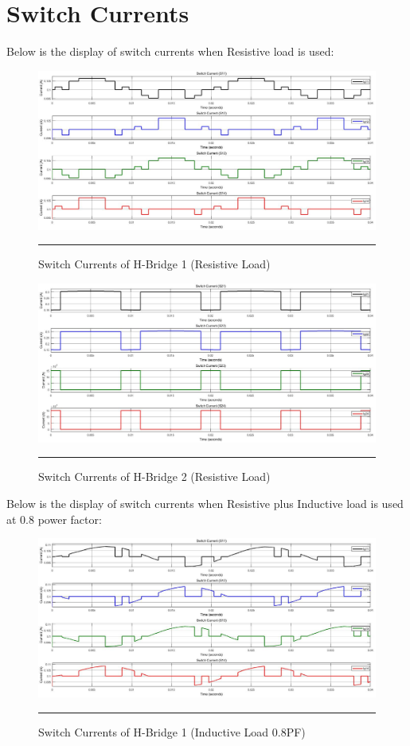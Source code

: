\section{Switch Currents}
Below is the display of switch currents when Resistive load is used:
\begin{figure}[htbp]
	\centering
	\includegraphics[width = 6in]{./Figures/Photos/Simulink/Switch_currents_1_Res.jpg}
	\rule{35em}{1pt}
	\caption{Switch Currents of H-Bridge 1 (Resistive Load)}
\end{figure}

\begin{figure}[htbp]
	\centering
	\includegraphics[width = 6in]{./Figures/Photos/Simulink/Switch_currents_2_Res.jpg}
	\rule{35em}{1pt}
	\caption{Switch Currents of H-Bridge 2 (Resistive Load)}
\end{figure}
\newpage
Below is the display of switch currents when Resistive plus Inductive load is used at 0.8 power factor:
\begin{figure}[htbp]
	\centering
	\includegraphics[width = 6in]{./Figures/Photos/Simulink/Switch_currents_1_Induc.jpg}
	\rule{35em}{1pt}
	\caption{Switch Currents of H-Bridge 1 (Inductive Load 0.8PF)}
\end{figure}

